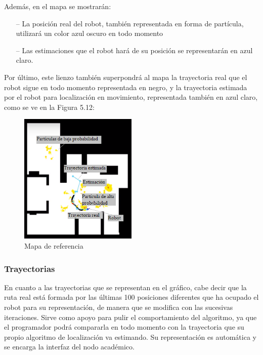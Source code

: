 Además, en el mapa se mostrarán:
\begin{itemize}
	\item[--] La posición real del robot, también representada en forma de partícula, utilizará un color azul oscuro en todo momento
	\item[--] Las estimaciones que el robot hará de su posición se representarán en azul claro.
\end{itemize}

Por último, este lienzo también superpondrá al mapa la trayectoria real que el robot sigue en todo momento representada en negro, y la trayectoria estimada por el robot para localización en movimiento, representada también en azul claro, como se ve en la Figura 5.12:

\begin{figure}[H]
	\begin{center}
		\includegraphics[width=0.5\textwidth]{figures/mapareferencia.png}
		\caption{Mapa de referencia}
		\label{fig.mapareferencia}
		\end{center}
\end{figure}

\subsubsection{Trayectorias}
En cuanto a las trayectorias que se representan en el gráfico, cabe decir que la ruta real está formada por las últimas 100 posiciones diferentes que ha ocupado el robot para su representación, de manera que se modifica con las sucesivas iteraciones. Sirve como apoyo para pulir el comportamiento del algoritmo, ya que el programador podrá compararla en todo momento con la trayectoria que su propio algoritmo de localización va estimando. Su representación es automática y se encarga la interfaz del nodo académico.

